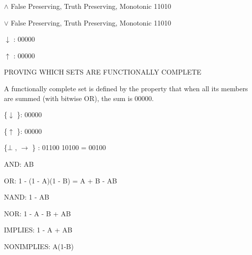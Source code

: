 $\land$  False Preserving, Truth Preserving, Monotonic 11010

$\lor$  False Preserving, Truth Preserving, Monotonic 11010

$\downarrow$ : 00000

$\uparrow$ : 00000

PROVING WHICH SETS ARE FUNCTIONALLY COMPLETE

A functionally complete set is defined by the property that when all its
members are summed (with bitwise OR), the sum is 00000.

\{$\downarrow$ \}: 00000

\{$\uparrow$ \}: 00000

\{$\bot$ , $\to$ \} : 01100 \textbar\textbar{} 10100 = 00100

AND: AB

OR: 1 - (1 - A)(1 - B) = A + B - AB

NAND: 1 - AB

NOR: 1 - A - B + AB

IMPLIES: 1 - A + AB

NONIMPLIES: A(1-B)